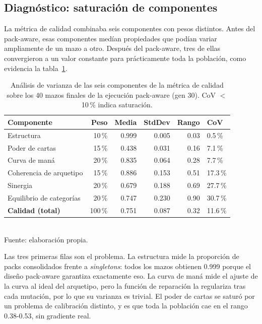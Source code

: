 \subsection{Diagnóstico: saturación de componentes}

La métrica de calidad combinaba seis componentes con pesos distintos. Antes del pack-aware, esas componentes medían propiedades que podían variar ampliamente de un mazo a otro. Después del pack-aware, tres de ellas convergieron a un valor constante para prácticamente toda la población, como evidencia la tabla~\ref{tab:cov-quality}.

\begin{table}[H]
\centering
\caption{Análisis de varianza de las seis componentes de la métrica de calidad sobre los 40 mazos finales de la ejecución pack-aware (gen 30). CoV $<$ 10\,\% indica saturación.}
\label{tab:cov-quality}
\begin{tabular}{lrrrrl}
\toprule
\textbf{Componente} & \textbf{Peso} & \textbf{Media} & \textbf{StdDev} & \textbf{Rango} & \textbf{CoV} \\
\midrule
Estructura                & 10\,\% & 0.999 & 0.005 & 0.03 & 0.5\,\% \\
Poder de cartas           & 15\,\% & 0.438 & 0.031 & 0.16 & 7.1\,\% \\
Curva de maná             & 20\,\% & 0.835 & 0.064 & 0.28 & 7.7\,\% \\
\midrule
Coherencia de arquetipo   & 15\,\% & 0.886 & 0.153 & 0.51 & 17.3\,\% \\
Sinergia                  & 20\,\% & 0.679 & 0.188 & 0.69 & 27.7\,\% \\
Equilibrio de categorías  & 20\,\% & 0.747 & 0.230 & 0.90 & 30.7\,\% \\
\midrule
\textbf{Calidad (total)} & 100\,\% & 0.751 & 0.087 & 0.32 & 11.6\,\% \\
\bottomrule
\end{tabular}
\\[2pt]{\footnotesize Fuente: elaboración propia.}
\end{table}

Las tres primeras filas son el problema. La estructura mide la proporción de packs consolidados frente a \emph{singletons}: todos los mazos obtienen 0.999 porque el diseño pack-aware garantiza exactamente eso. La curva de maná mide el ajuste de la curva al ideal del arquetipo, pero la función de reparación la regulariza tras cada mutación, por lo que su varianza es trivial. El poder de cartas se saturó por un problema de calibración distinto, y es que toda la población cae en el rango 0.38-0.53, sin gradiente real.

